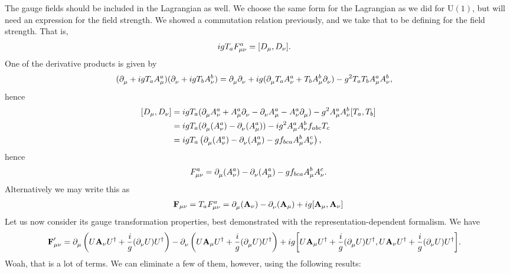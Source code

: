 The gauge fields should be included in the Lagrangian as well. We choose the same form for the Lagrangian as we did for $\text{U}(1)$, but will need an expression for the field strength. We showed a commutation relation previously, and we take that to be defining for the field strength. That is,
\begin{align*}
	igT_{a}F_{\mu\nu}^{a} &= \comm{D_{\mu}}{D_{\nu}}.
\end{align*}
One of the derivative products is given by
\begin{align*}
	(\partial^{}_{\mu} + igT_{a}A_{\mu}^{a})(\partial^{}_{\nu} + igT_{b}A_{\nu}^{b}) &= \partial^{}_{\mu}\partial^{}_{\nu} + ig(\partial^{}_{\mu}T_{a}A_{\nu}^{a} + T_{b}A_{\mu}^{b}\partial^{}_{\nu}) - g^{2}T_{a}T_{b}A_{\mu}^{a}A_{\nu}^{b},
\end{align*}
hence
\begin{align*}
	\comm{D_{\mu}}{D_{\nu}} &= igT_{a}(\del{}{\mu}A_{\nu}^{a} + A_{\mu}^{a}\del{}{\nu} - \del{}{\nu}A_{\mu}^{a} - A_{\nu}^{a}\del{}{\mu}) - g^{2}A_{\mu}^{a}A_{\nu}^{b}\comm{T_{a}}{T_{b}} \\
	                        &= igT_{a}(\del{}{\mu}(A_{\nu}^{a}) - \del{}{\nu}(A_{\mu}^{a})) - ig^{2}A_{\mu}^{a}A_{\nu}^{b}f_{abc}T_{c} \\
	                        &= igT_{a}\left(\del{}{\mu}(A_{\nu}^{a}) - \del{}{\nu}(A_{\mu}^{a}) - gf_{bca}A_{\mu}^{b}A_{\nu}^{c}\right),
\end{align*}
hence
\begin{align*}
	F_{\mu\nu}^{a} = \partial^{}_{\mu}(A_{\nu}^{a}) - \partial^{}_{\nu}(A_{\mu}^{a}) - gf_{bca}A_{\mu}^{b}A_{\nu}^{c}.
\end{align*}
Alternatively we may write this as
\begin{align*}
	\textbf{F}_{\mu\nu} = T_{a}F^{a}_{\mu\nu} = \del{}{\mu}(\textbf{A}_{\nu}) - \del{}{\nu}(\textbf{A}_{\mu}) + ig\comm{\textbf{A}_{\mu}}{\textbf{A}_{\nu}}
\end{align*}
Let us now consider its gauge transformation properties, best demonstrated with the representation-dependent formalism. We have
\begin{align*}
	\textbf{F}_{\mu\nu}\p &= \del{}{\mu}\left(U\textbf{A}_{\nu}U\adj + \frac{i}{g}(\del{}{\nu}U)U\adj\right) - \del{}{\nu}\left(U\textbf{A}_{\mu}U\adj + \frac{i}{g}(\del{}{\mu}U)U\adj\right) + ig\comm{U\textbf{A}_{\mu}U\adj + \frac{i}{g}(\del{}{\mu}U)U\adj}{U\textbf{A}_{\nu}U\adj + \frac{i}{g}(\del{}{\nu}U)U\adj}.
\end{align*}
Woah, that is a lot of terms. We can eliminate a few of them, however, using the following results:
